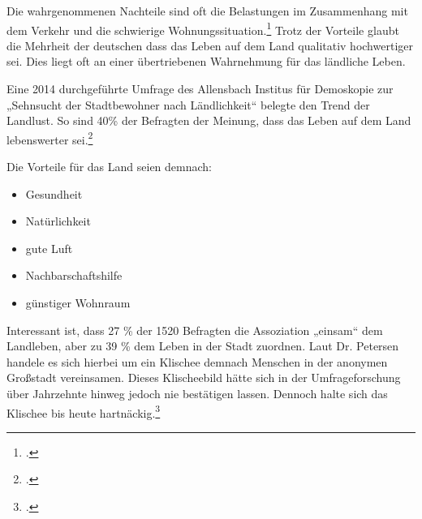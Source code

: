\documentclass{scrartcl}
\begin{document}
Die wahrgenommenen Nachteile sind oft die Belastungen im Zusammenhang mit dem Verkehr und die schwierige Wohnungssituation.\footcite[S. 41]{Egnolff2015DieIdeal} Trotz der Vorteile glaubt die Mehrheit der deutschen dass das Leben auf dem Land qualitativ hochwertiger sei. Dies liegt oft an einer übertriebenen Wahrnehmung für das ländliche Leben.

Eine 2014 durchgeführte Umfrage des Allensbach Institus für Demoskopie zur „Sehnsucht der Stadtbewohner nach Ländlichkeit“ belegte den Trend der Landlust. So sind 40\% der Befragten der Meinung, dass das Leben auf dem Land lebenswerter sei.\footcite[Vgl.][S. 15 Abb.2]{Dr.ThomasPetersen2014DieLandlichkeit}


Die Vorteile für das Land seien demnach:

\begin{itemize}
    \item Gesundheit
    \item Natürlichkeit
    \item gute Luft
    \item Nachbarschaftshilfe
    \item günstiger Wohnraum
\end{itemize}

Interessant ist, dass 27 \% der 1520 Befragten die Assoziation „einsam“ dem Landleben, aber zu 39 \% dem Leben in der Stadt zuordnen. Laut Dr. Petersen handele es sich hierbei um ein Klischee demnach Menschen in der anonymen Großstadt vereinsamen. Dieses Klischeebild hätte sich in der Umfrageforschung über Jahrzehnte hinweg jedoch nie bestätigen lassen. Dennoch halte sich das Klischee bis heute hartnäckig.\footcite[Vgl.][S. 7ff]{Dr.ThomasPetersen2014DieLandlichkeit}
\end{document}
